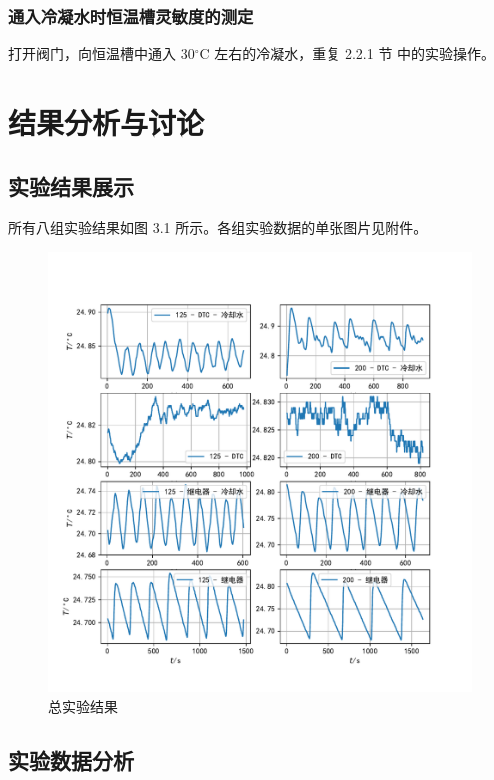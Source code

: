 \documentclass[12pt]{ctexart}
\numberwithin{equation}{section}
\begin{document}
\subsubsection{通入冷凝水时恒温槽灵敏度的测定}

打开阀门，向恒温槽中通入 30$^\circ$C 左右的冷凝水，重复 2.2.1 节
中的实验操作。

\section{结果分析与讨论}
\subsection{实验结果展示}

所有八组实验结果如图 3.1 所示。各组实验数据的单张图片见附件。

\begin{figure}[!h]
    \centering
    \includegraphics[scale=0.88]{plot_all.pdf}
    \caption{总实验结果}
\end{figure}

\subsection{实验数据分析}
\end{document}
